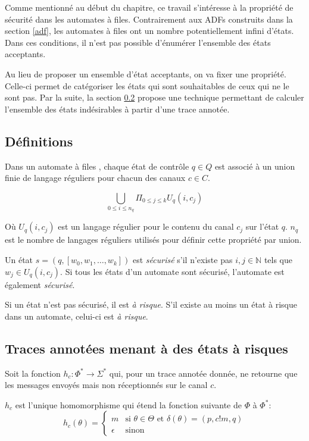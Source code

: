 Comme mentionné au début du chapitre, ce travail s'intéresse à la propriété de sécurité dans les automates à files. Contrairement aux ADFs construits dans la section \ref{adf}, les automates à files ont un nombre potentiellement infini d'états. Dans ces conditions, il n'est pas possible d'énumérer l'ensemble des états acceptants.

Au lieu de proposer un ensemble d'état acceptants, on va fixer une propriété. Celle-ci permet de catégoriser les états qui sont souhaitables de ceux qui ne le sont pas. Par la suite, la section \ref{ss:tracesafety} propose une technique permettant de calculer l'ensemble des états indésirables à partir d'une trace annotée.

\subsection{Définitions}
Dans un automate à files \fifo, chaque état de contrôle $q\in Q$ est associé à un union finie de langage réguliers pour chacun des canaux $c\in C$.


$$\bigcup_{0 \leq i \leq n_q}\Pi_{0 \leq j \leq k}U_q(i,c_j)$$

Où $U_q(i,c_j)$ est un langage régulier pour le contenu du canal $c_j$ sur l'état $q$. $n_q$ est le nombre de langages réguliers utilisés pour définir cette propriété par union.

Un état $s=(q,[w_0,w_1,\dots,w_k])$ est \emph{sécurisé} s'il n'existe pas $i,j \in \mathbb{N}$ tels que $w_j \in U_q(i,c_j)$. Si tous les états d'un automate sont sécurisé, l'automate est également \emph{sécurisé}.

Si un état n'est pas sécurisé, il est \emph{à risque}. S'il existe au moins un état à risque dans un automate, celui-ci est \emph{à risque}.



\subsection{Traces annotées menant à des états à risques}\label{ss:tracesafety}

Soit la fonction $h_c:\Phi^*\rightarrow\Sigma^*$ qui, pour un trace annotée donnée, ne retourne que les messages envoyés mais non réceptionnés sur le canal $c$.

$h_c$ est l'unique homomorphisme qui étend la fonction suivante de $\Phi$ à $\Phi^*$:
$$ h_c(\theta) = \left\{ \begin{array}{ll}
      m & \text{si } \theta\in\Theta\text{ et }\delta(\theta)=(p,c!m,q)\\
      \epsilon & \text{sinon}\end{array} \right. $$



